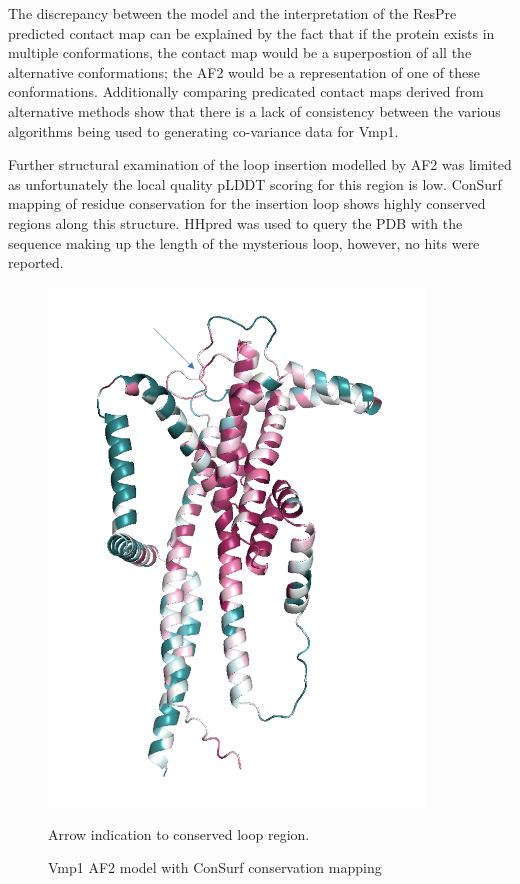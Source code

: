The discrepancy between the model and the interpretation of the ResPre predicted contact map can be explained by the fact that if the protein exists in multiple conformations, the contact map would be a superpostion of all the alternative conformations; the AF2 would be a representation of one of these conformations.  Additionally comparing predicated contact maps derived from alternative methods show that there is a lack of consistency between the various algorithms being used to generating co-variance data for Vmp1.

Further structural examination of the loop insertion modelled by AF2 was limited as unfortunately the local quality pLDDT scoring for this region is low.  ConSurf mapping of residue conservation for the insertion loop shows highly conserved regions along this structure. HHpred was used to query the PDB with the sequence making up the length of the mysterious loop, however, no hits were reported.

\begin{figure}[th!]
    \centering
    \includegraphics[width=100mm, scale =0.5]{Results/vmp1_af_consurf.png}
    \caption{Vmp1 AF2 model with ConSurf conservation mapping }
    \label{fig:vmp1_af}
    \small
    Arrow indication to conserved loop region.
\end{figure}

